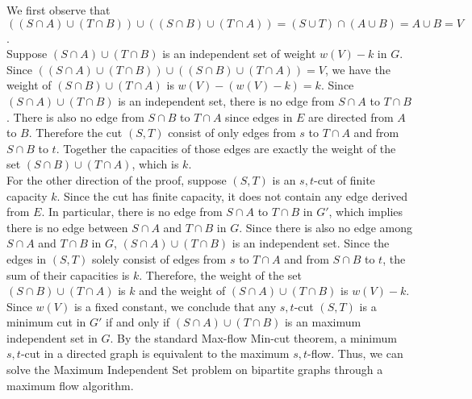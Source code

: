 \documentclass{bmcart}
\begin{document}
We first observe that $((S \cap A) \cup (T\cap B)) \cup ((S \cap B) \cup (T \cap A)) = (S\cup T) \cap (A \cup B) = A \cup B = V$. \\

Suppose $(S \cap A) \cup (T\cap B)$ is an independent set of weight $w(V) - k$ in $G$. Since $((S \cap A) \cup (T\cap B)) \cup ((S \cap B) \cup (T \cap A)) = V$, we have the weight of $(S \cap B) \cup (T \cap A)$ is $w(V)-(w(V)-k) = k$. Since $(S \cap A) \cup (T\cap B)$ is an independent set, there is no edge from $S \cap A$ to $T\cap B$. There is also no edge from $S \cap B$ to $T \cap A$ since edges in $E$ are directed from $A$ to $B$. Therefore the cut $(S,T)$ consist of only edges from $s$ to $T \cap A$ and from $S \cap B$ to $t$. Together the capacities of those edges are exactly the weight of the set $(S \cap B) \cup (T \cap A)$, which is $k$. \\

For the other direction of the proof, suppose $(S,T)$ is an $s,t$-cut of finite capacity $k$. Since the cut has finite capacity, it does not contain any edge derived from $E$. In particular, there is no edge from $S \cap A$ to $T \cap B$ in $G'$, which implies there is no edge between $S\cap A$ and $T\cap B$ in $G$. Since there is also no edge among $S\cap A$ and $T\cap B$ in $G$, $(S\cap A) \cup (T \cap B)$ is an independent set. Since the edges in $(S,T)$ solely consist of edges from $s$ to $T \cap A$ and from $S \cap B$ to $t$, the sum of their capacities is $k$. Therefore, the weight of the set $(S \cap B) \cup (T \cap A)$ is $k$ and the weight of $(S\cap A) \cup (T \cap B)$ is $w(V)- k$.\\

Since $w(V)$ is a fixed constant, we conclude that any $s,t$-cut $(S,T)$ is a minimum cut in $G'$ if and only if $(S\cap A) \cup (T \cap B)$ is an maximum independent set in $G$. By the standard Max-flow Min-cut theorem, a minimum $s,t$-cut in a directed graph is equivalent to the maximum $s,t$-flow. Thus, we can solve the Maximum Independent Set problem on bipartite graphs through a maximum flow algorithm.\\
\end{document}
